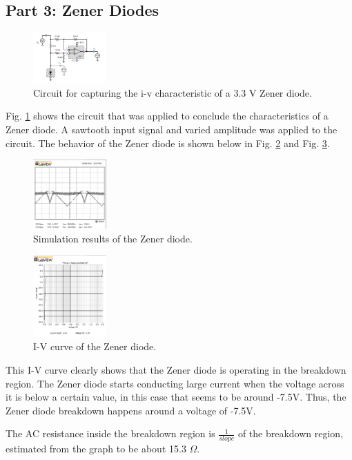 \documentclass[letterpaper, 10 pt, conference]{ieeeconf}  %
\begin{document}
    \subsection{Part 3: Zener Diodes}
    \begin{figure}[h]
      \centering
        \includegraphics[width=0.25\textwidth]{images/zener_circuit.png}
      \caption{Circuit for capturing the i-v characteristic of a 3.3 V Zener diode.}
      \label{fig:zener_1}
    \end{figure}
    Fig. \ref{fig:zener_1} shows the circuit that was applied to conclude the characteristics of
    a Zener diode. A sawtooth input signal and varied amplitude was applied to the circuit. The behavior
    of the Zener diode is shown below in Fig. \ref{fig:zener_2} and Fig. \ref{fig:zener_3}.
    \begin{figure}[h]
      \centering
        \includegraphics[width=0.25\textwidth]{images/zener_simu.png}
      \caption{Simulation results of the Zener diode.}
      \label{fig:zener_2}
    \end{figure}
    \begin{figure}[h]
      \centering
        \includegraphics[width=0.25\textwidth]{images/zener_iv.png}
      \caption{I-V curve of the Zener diode.}
      \label{fig:zener_3}
    \end{figure}
    This I-V curve clearly shows that the Zener diode is operating in the breakdown region.
    The Zener diode starts conducting large current when the voltage across it is below
    a certain value, in this case that seems to be around -7.5V.
    Thus, the Zener diode breakdown happens around a voltage of -7.5V.
    \par The AC resistance inside the breakdown region is $\frac{1}{slope}$ of the breakdown region,
    estimated from the graph to be about 15.3 $\Omega$.
\end{document}
